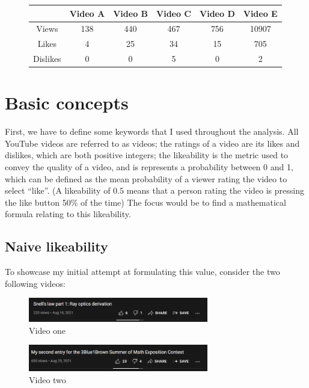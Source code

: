 \documentclass[a4paper,11pt]{article}
\begin{document}
\begin{figure}[H]
    \centering
    \begin{tabular}{c|c|c|c|c|c}
        & Video A & Video B & Video C & Video D & Video E \\
        \hline
        \hline
        Views & 138 & 440 & 467 & 756 & 10907 \\
        \hline
        Likes & 4 & 25 & 34 & 15 & 705 \\
        \hline
        Dislikes & 0 & 0 & 5 & 0 & 2
    \end{tabular}
    \label{tbl:videos}
\end{figure}


\section{Basic concepts}
First, we have to define some keywords that I used throughout the analysis. All YouTube videos are referred to as videos; the ratings of a video are its likes and dislikes, which are both positive integers; the likeability is the metric used to convey the quality of a video, and is represents a probability between 0 and 1, which can be defined as the mean probability of a viewer rating the video to select ``like''. (A likeability of $0.5$ means that a person rating the video is pressing the like button 50\% of the time) The focus would be to find a mathematical formula relating to this likeability.

\subsection{Naive likeability}
To showcase my initial attempt at formulating this value, consider the two following videos:

\begin{figure}[H]
    \centering
    \includegraphics[width=0.7\textwidth]{assets/s_vid2.png}
    \caption{Video one \parencite{fluency_2021}}
    \label{fig:vid1}
\end{figure}

\begin{figure}[H]
    \centering
    \includegraphics[width=0.7\textwidth]{assets/s_vid1.png}
    \caption{Video two \parencite{division_2021}}
    \label{fig:vid2}
\end{figure}
\end{document}
